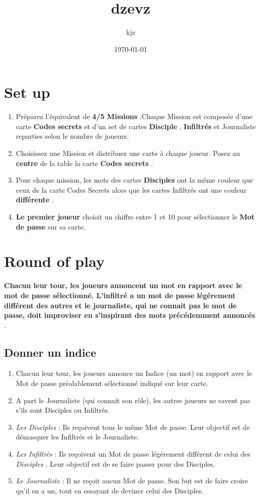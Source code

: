 \documentclass{article}%
\title{dzevz}%
\author{kjz}%
\date{\today}%
\begin{document}
%
\pagestyle{empty}%
\normalsize%
\maketitle%
\section{ Set up
}%
\label{sec:Setup}%
\begin{enumerate}%
\item%
%
  Préparez l'équivalent de %
\textbf{4/5 Missions}%
.Chaque Mission est composée d'une carte %
\textbf{Codes secrets}%
  et d'un set de cartes %
\textbf{Disciple}%
,%
\textbf{ Infiltrés}%
  et Journaliste reparties selon le nombre de joueurs.
%
\item%
%
  Choisissez une Mission et distribuez une carte à chaque joueur. Posez au %
\textbf{centre}%
  de la table la carte %
\textbf{Codes secrets}%
.
%
\item%
%
  Pour chaque mission, les mots des cartes %
\textbf{Disciples}%
  ont la même couleur que ceux de la carte Codes Secrets alors que les cartes Infiltrés ont une couleur %
\textbf{différente}%
.
%
\item%
%
\textbf{Le premier joueur}%
  choisit un chiffre entre 1 et 10 pour sélectionner le %
\textbf{Mot de passe}%
  sur sa carte.
%
\end{enumerate}

%
\section{ Round of play
}%
\label{sec:Roundofplay}%
\textbf{Chacun leur tour, les joueurs annoncent un mot en rapport avec le mot de passe sélectionné. L'infiltré a un mot de passe légérement différent des autres et le journaliste, qui ne connait pas le mot de passe, doit improviser en s'inspirant des mots précédemment annoncés}%
.


%
\subsection{ Donner un indice
}%
\label{subsec:Donnerunindice}%
\begin{enumerate}%
\item%
%
  Chacun leur tour, les joueurs annonce un Indice (un mot) en rapport avec le Mot de passe préalablement sélectionné indiqué sur leur carte.
%
\item%
%
  A part le Journaliste (qui connait son rôle), les autres joueurs ne savent pas s'ils sont Disciples ou Infiltrés.
%
\item%
%
\textit{Les Disciples}%
  : Ils reçoivent tous le même Mot de passe. Leur objectif est de démasquer les Infiltrés et le Journaliste.
%
\item%
%
\textit{Les Infiltrés}%
  : Ils reçoivent un Mot de passe légérement différent de celui des %
\textit{Disciples}%
. Leur objectif est de se faire passer pour des Disciples.
%
\item%
%
\textit{Le Journaliste}%
  : Il ne reçoit aucun Mot de passe. Son but est de faire croire qu'il en a un, tout en essayant de deviner celui des Disciples.
%
\end{enumerate}
\end{document}
